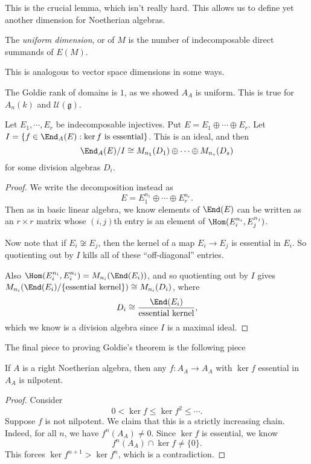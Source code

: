 \documentclass[a4paper]{article}
\begin{document}
This is the crucial lemma, which isn't really hard. This allows us to define yet another dimension for Noetherian algebras.
\begin{defi}
  The \emph{uniform dimension}, or  of $M$ is the number of indecomposable direct summands of $E(M)$.
\end{defi}
This is analogous to vector space dimensions in some ways.

\begin{eg}
  The Goldie rank of domains is $1$, as we showed $A_A$ is uniform. This is true for $A_n(k)$ and $\mathcal{U}(\mathfrak{g})$.
\end{eg}

\begin{lemma}
  Let $E_1, \cdots, E_r$ be indecomposable injectives. Put $E = E_1 \oplus \cdots \oplus E_r$. Let $I = \{f \in \End_A(E): \ker f\text{ is essential}\}$. This is an ideal, and then
  \[
    \End_A(E)/I \cong M_{n_1}(D_1) \oplus \cdots \oplus M_{n_s}(D_s)
  \]
  for some division algebras $D_i$.
\end{lemma}

\begin{proof}
  We write the decomposition instead as
  \[
    E = E_1^{n_1} \oplus \cdots \oplus E_r^{n_r}.
  \]
  Then as in basic linear algebra, we know elements of $\End(E)$ can be written as an $r \times r$ matrix whose $(i, j)$th entry is an element of $\Hom(E_i^{n_i}, E_j^{n_j})$.

  Now note that if $E_i \not \cong E_j$, then the kernel of a map $E_i \to E_j$ is essential in $E_i$. So quotienting out by $I$ kills all of these ``off-diagonal'' entries.

  Also $\Hom(E_i^{n_i}, E_i^{n_i}) = M_{n_i}(\End(E_i))$, and so quotienting out by $I$ gives $M_{n_i}(\End(E_i)/\{\text{essential kernel}\}) \cong M_{n_i}(D_i)$, where
  \[
    D_i \cong \frac{\End(E_i)}{\text{essential kernel}},
  \]
  which we know is a division algebra since $I$ is a maximal ideal.
\end{proof}

The final piece to proving Goldie's theorem is the following piece
\begin{lemma}
  If $A$ is a right Noetherian algebra, then any $f: A_A \to A_A$ with $\ker f$ essential in $A_A$ is nilpotent.
\end{lemma}

\begin{proof}
  Consider
  \[
    0 < \ker f \leq \ker f^2 \leq \cdots.
  \]
  Suppose $f$ is not nilpotent. We claim that this is a strictly increasing chain. Indeed, for all $n$, we have $f^n(A_A) \not= 0$. Since $\ker f$ is essential, we know
  \[
    f^n(A_A) \cap \ker f \not= \{0\}.
  \]
  This forces $\ker f^{n + 1} > \ker f^n$, which is a contradiction.
\end{proof}
\end{document}
